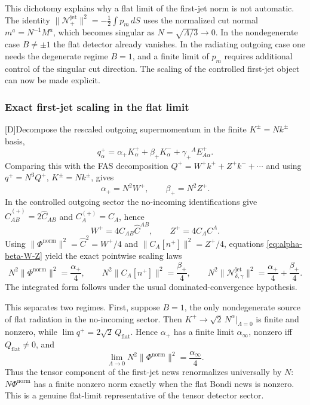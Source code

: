 \documentclass[11pt,a4paper]{article}
\newcommand{\cN}{\mathcal{N}}
\newcommand{\statusD}{\textsf{[D]}}
\begin{document}
This dichotomy explains why a flat limit of the first-jet norm is not automatic.  The identity \(\|\cN^{\mathrm{jet}}_+\|^2=-\tfrac12\int p_m\,dS\) uses the normalized cut normal \(m^a=N^{-1}M^a\), which becomes singular as \(N=\sqrt{\Lambda/3}\to0\).  In the nondegenerate case \(B\neq\pm1\) the flat detector already vanishes.  In the radiating outgoing case one needs the degenerate regime \(B=1\), and a finite limit of \(p_m\) requires additional control of the singular cut direction.  The scaling of the controlled first-jet object can now be made explicit.

\subsubsection{Exact first-jet scaling in the flat limit}

\statusD Decompose the rescaled outgoing supermomentum in the finite \(K^\pm=Nk^\pm\) basis,
\begin{equation}\label{eq:qK-basis}
  q^+_\alpha
  =
  \alpha_+ K^+_\alpha
  +
  \beta_+ K^-_\alpha
  +
  \gamma_+{}^A E^+_{A\alpha} .
\end{equation}
Comparing this with the FAS decomposition
\(Q^+=W^+k^++Z^+k^-+\cdots\) and using \(q^+=N^3Q^+\), \(K^\pm=Nk^\pm\), gives
\begin{equation}\label{eq:alpha-beta-W-Z}
  \alpha_+=N^2W^+,
  \qquad
  \beta_+=N^2Z^+ .
\end{equation}
In the controlled outgoing sector the no-incoming identifications give
\(\hat C^{(+)}_{AB}=2\hat C_{AB}\) and \(C^{(+)}_A=C_A\), hence
\begin{equation}
  W^+=4\hat C_{AB}\hat C^{AB},
  \qquad
  Z^+=4C_AC^A .
\end{equation}
Using \(\|\Phi^{\mathrm{norm}}\|^2=\hat C^2=W^+/4\) and
\(\|C_A[n^+]\|^2=Z^+/4\), equations \eqref{eq:alpha-beta-W-Z} yield the exact pointwise scaling laws
\begin{equation}\label{eq:first-jet-flat-scaling}
  N^2\|\Phi^{\mathrm{norm}}\|^2
  =
  \frac{\alpha_+}{4},
  \qquad
  N^2\|C_A[n^+]\|^2
  =
  \frac{\beta_+}{4},
  \qquad
  N^2\|\cN^{\mathrm{jet}}_{\delta,\gamma}\|^2
  =
  \frac{\alpha_+}{4}+\frac{\beta_+}{4}.
\end{equation}
The integrated form follows under the usual dominated-convergence hypothesis.

This separates two regimes.  First, suppose \(B=1\), the only nondegenerate source of flat radiation in the no-incoming sector.  Then \(K^+\to\sqrt2\,N^\alpha|_{\Lambda=0}\) is finite and nonzero, while \(\lim q^+=2\sqrt2\,Q_{\mathrm{flat}}\).  Hence \(\alpha_+\) has a finite limit \(\alpha_\infty\), nonzero iff \(Q_{\mathrm{flat}}\neq0\), and
\begin{equation}\label{eq:tensor-jet-flat-limit}
  \lim_{\Lambda\to0}
  N^2\|\Phi^{\mathrm{norm}}\|^2
  =
  \frac{\alpha_\infty}{4}.
\end{equation}
Thus the tensor component of the first-jet news renormalizes universally by \(N\): \(N\Phi^{\mathrm{norm}}\) has a finite nonzero norm exactly when the flat Bondi news is nonzero.  This is a genuine flat-limit representative of the tensor detector sector.
\end{document}
